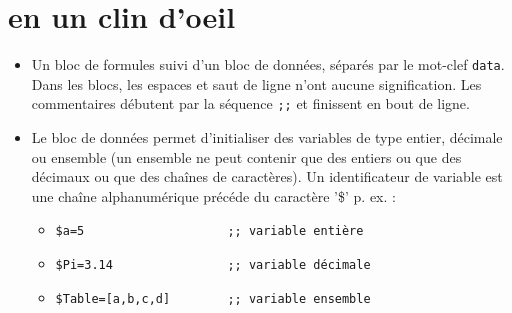 \section{\texttt{\touist} en un clin d'oeil}
\begin{itemize}
\item Un bloc de formules suivi d'un bloc de données, séparés par le mot-clef \texttt{data}. Dans les blocs, les espaces et saut de ligne n'ont aucune signification. Les commentaires débutent par la séquence \texttt{;;} et finissent en bout de ligne. 
\item Le bloc de données permet d'initialiser des variables de type entier, décimale ou ensemble (un ensemble ne peut contenir que des entiers ou que des décimaux ou que des chaînes de caractères). Un identificateur de variable est une chaîne alphanumérique précéde du caractère '\$' p. ex. : 
	\begin{itemize}
	\item \verb+$a=5					;; variable entière+
	\item \verb+$Pi=3.14				;; variable décimale+
	\item \verb+$Table=[a,b,c,d]		;; variable ensemble+
    \end{itemize}


\end{itemize}
